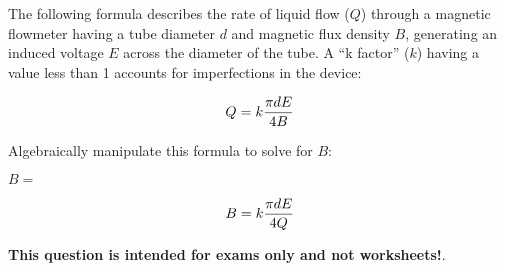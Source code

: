 

The following formula describes the rate of liquid flow ($Q$) through a magnetic flowmeter having a tube diameter $d$ and magnetic flux density $B$, generating an induced voltage $E$ across the diameter of the tube.  A ``k factor'' ($k$) having a value less than 1 accounts for imperfections in the device:

$$Q = k {\pi d E \over 4 B}$$

Algebraically manipulate this formula to solve for $B$:

\vskip 20pt

$B = $







$$B = k {\pi d E \over 4 Q}$$







{\bf This question is intended for exams only and not worksheets!}.




